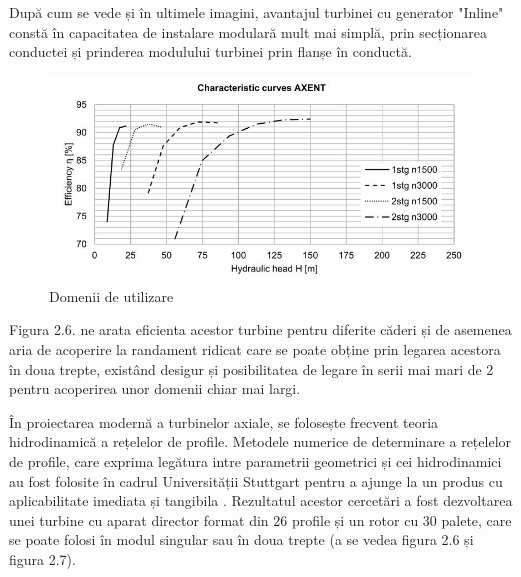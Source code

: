 După cum se vede și în ultimele imagini, avantajul turbinei cu generator "Inline" constă în capacitatea de instalare modulară mult mai simplă, prin secționarea conductei și prinderea modulului turbinei prin flanșe în conductă.

\begin{figure}[h!]
	\centering
	\includegraphics[scale=0.7]{figures/rezultate_Neipp_2014.JPG}
	\caption{Domenii de utilizare \protect\cite{neipp2017zweistufige}}
	\label{Domenii de utilizare}
\end{figure}

Figura 2.6. ne arata eficienta acestor turbine pentru diferite căderi și de asemenea aria de acoperire la randament ridicat care se poate obține prin legarea acestora în doua trepte, existând desigur și posibilitatea de legare în serii mai mari de 2 pentru acoperirea unor domenii chiar mai largi.

În proiectarea modernă a turbinelor axiale, se folosește frecvent teoria hidrodinamică a rețelelor de profile. Metodele numerice de determinare a rețelelor de profile, care exprima legătura intre parametrii geometrici și cei hidrodinamici au fost folosite în cadrul Universității Stuttgart pentru a ajunge la un produs cu aplicabilitate imediata și tangibila \cite{gentner2000experimentelle}. Rezultatul acestor cercetări a fost dezvoltarea unei turbine cu aparat director format din 26 profile și un rotor cu 30 palete, care se poate folosi în modul singular sau în doua trepte (a se vedea figura 2.6 și figura 2.7).

